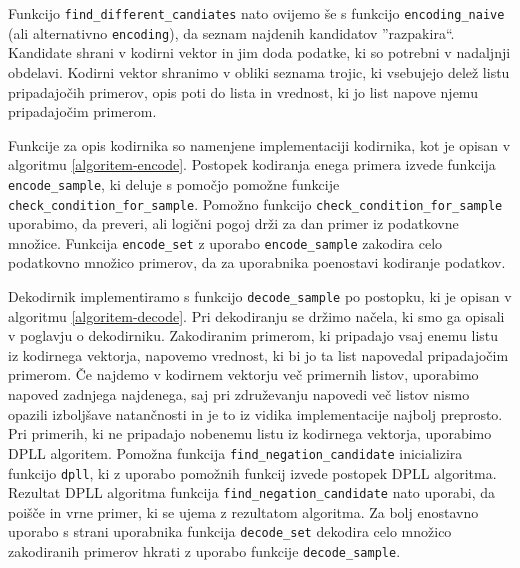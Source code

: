 \documentclass[12pt,a4paper]{article}
\begin{document}
Funkcijo \texttt{find\_different\_candiates} nato ovijemo še s funkcijo \texttt{encoding\_naive} (ali alternativno \texttt{encoding}), da seznam najdenih kandidatov ''razpakira``.
Kandidate shrani v kodirni vektor in jim doda podatke, ki so potrebni v nadaljnji obdelavi. %
Kodirni vektor shranimo v obliki seznama trojic, ki vsebujejo delež listu pripadajočih primerov, opis poti do lista in vrednost, ki jo list napove njemu pripadajočim primerom.





Funkcije za opis kodirnika so namenjene implementaciji kodirnika, kot je opisan v algoritmu \ref{algoritem-encode}.
Postopek kodiranja enega primera izvede funkcija \texttt{encode\_sample}, ki deluje s pomočjo pomožne funkcije \texttt{check\_condition\_for\_sample}.
Pomožno funkcijo \texttt{check\_condition\_for\_sample} uporabimo, da preveri, ali logični pogoj drži za dan primer iz podatkovne množice.
Funkcija \texttt{encode\_set} z uporabo \texttt{encode\_sample} zakodira celo podatkovno množico primerov, da za uporabnika poenostavi kodiranje podatkov.



Dekodirnik implementiramo s funkcijo \texttt{decode\_sample} po postopku, ki je opisan v algoritmu \ref{algoritem-decode}.
Pri dekodiranju se držimo načela, ki smo ga opisali v poglavju o dekodirniku.
Zakodiranim primerom, ki pripadajo vsaj enemu listu iz kodirnega vektorja, napovemo vrednost, ki bi jo ta list napovedal pripadajočim primerom.
Če najdemo v kodirnem vektorju več primernih listov, uporabimo napoved zadnjega najdenega, 
saj pri združevanju napovedi več listov nismo opazili izboljšave natančnosti in je to iz vidika implementacije najbolj preprosto.
Pri primerih, ki ne pripadajo nobenemu listu iz kodirnega vektorja, uporabimo DPLL algoritem. %
Pomožna funkcija \texttt{find\_negation\_candidate} inicializira funkcijo \texttt{dpll}, ki z uporabo pomožnih funkcij izvede postopek DPLL algoritma. %
Rezultat DPLL algoritma funkcija \texttt{find\_negation\_candidate} nato uporabi, da poišče in vrne primer, ki se ujema z rezultatom algoritma.
Za bolj enostavno uporabo s strani uporabnika funkcija \texttt{decode\_set} dekodira celo množico zakodiranih primerov hkrati z uporabo funkcije \texttt{decode\_sample}.
\end{document}

